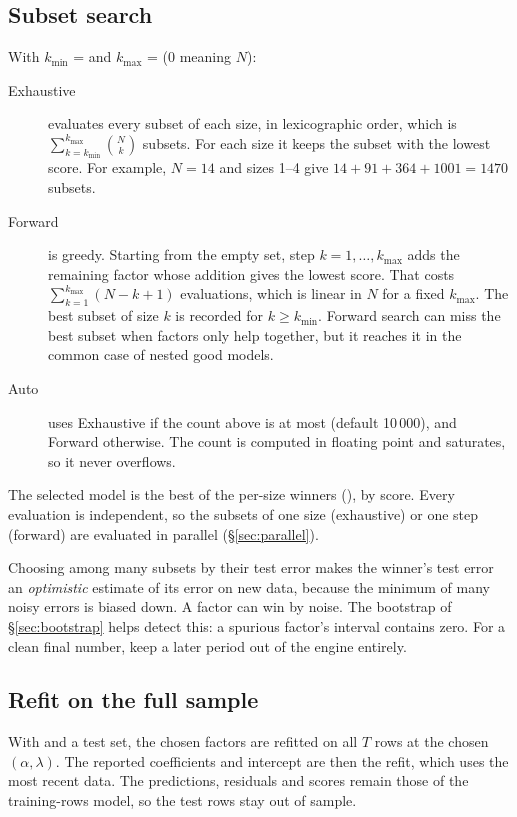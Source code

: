 \documentclass[11pt,a4paper]{article}
\begin{document}
\subsection{Subset search}\label{sec:search}

With $k_{\min}$ =  and $k_{\max}$ =  ($0$ meaning $N$):
\begin{description}
  \item[Exhaustive] evaluates every subset of each size, in lexicographic order, which is
        $\sum_{k=k_{\min}}^{k_{\max}}\binom Nk$ subsets. For each size it keeps the subset with
        the lowest score. For example, $N=14$ and sizes 1--4 give $14+91+364+1001=1470$
        subsets.
  \item[Forward] is greedy. Starting from the empty set, step $k=1,\dots,k_{\max}$ adds the
        remaining factor whose addition gives the lowest score. That costs
        $\sum_{k=1}^{k_{\max}}(N-k+1)$ evaluations, which is linear in $N$ for a fixed
        $k_{\max}$. The best subset of size $k$ is recorded for $k\ge k_{\min}$. Forward
        search can miss the best subset when factors only help together, but it reaches it
        in the common case of nested good models.
  \item[Auto] uses Exhaustive if the count above is at most 
        (default 10\,000), and Forward otherwise. The count is computed in floating point and
        saturates, so it never overflows.
\end{description}
The selected model is the best of the per-size winners (), by score. Every
evaluation is independent, so the subsets of one size (exhaustive) or one step (forward) are
evaluated in parallel (\S\ref{sec:parallel}).

\begin{remark}
Choosing among many subsets by their test error makes the winner's test error an
\emph{optimistic} estimate of its error on new data, because the minimum of many noisy
errors is biased down. A factor can win by noise. The bootstrap of \S\ref{sec:bootstrap}
helps detect this: a spurious factor's interval contains zero. For a clean final number,
keep a later period out of the engine entirely.
\end{remark}

\subsection{Refit on the full sample}\label{sec:refit}
With  and a test set, the chosen factors are refitted on all $T$
rows at the chosen $(\alpha,\lambda)$. The reported coefficients and intercept are then the
refit, which uses the most recent data. The predictions, residuals and scores remain those of
the training-rows model, so the test rows stay out of sample.
\end{document}
